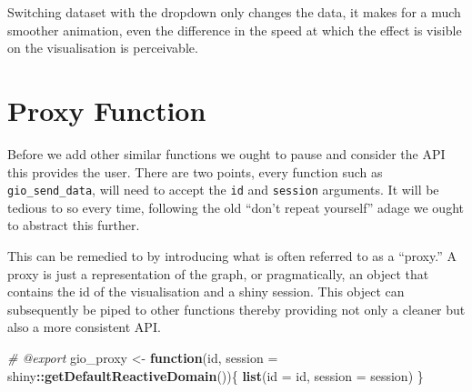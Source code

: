 \documentclass[
]{krantz}
\makeatletter
\newenvironment{Shaded}{\begin{snugshade}}{\end{snugshade}}
\newcommand{\CommentTok}[1]{\textcolor[rgb]{0.37,0.37,0.37}{\textit{#1}}}
\newcommand{\ControlFlowTok}[1]{\textcolor[rgb]{0.27,0.27,0.27}{\textbf{#1}}}
\newcommand{\DataTypeTok}[1]{\textcolor[rgb]{0.27,0.27,0.27}{#1}}
\newcommand{\KeywordTok}[1]{\textcolor[rgb]{0.27,0.27,0.27}{\textbf{#1}}}
\newcommand{\NormalTok}[1]{#1}
\newcommand{\OperatorTok}[1]{\textcolor[rgb]{0.43,0.43,0.43}{\textbf{#1}}}
\newcommand{\StringTok}[1]{\textcolor[rgb]{0.5,0.5,0.5}{#1}}
\newenvironment{kframe}{%
\medskip{}
\setlength{\fboxsep}{.8em}
 \def\at@end@of@kframe{}%
 \ifinner\ifhmode%
  \def\at@end@of@kframe{\end{minipage}}%
  \begin{minipage}{\columnwidth}%
 \fi\fi%
 \def\FrameCommand##1{\hskip\@totalleftmargin \hskip-\fboxsep
 \colorbox{shadecolor}{##1}\hskip-\fboxsep
     \hskip-\linewidth \hskip-\@totalleftmargin \hskip\columnwidth}%
 \MakeFramed {\advance\hsize-\width
   \@totalleftmargin\z@ \linewidth\hsize
   \@setminipage}}%
 {\par\unskip\endMakeFramed%
 \at@end@of@kframe}
\renewenvironment{Shaded}{\begin{kframe}}{\end{kframe}}
\makeatother
\begin{document}
\begin{Shaded}
\end{Shaded}

Switching dataset with the dropdown only changes the data, it makes for a much smoother animation, even the difference in the speed at which the effect is visible on the visualisation is perceivable.

\hypertarget{proxy-function}{%
\section*{Proxy Function}\label{proxy-function}}


Before we add other similar functions we ought to pause and consider the API this provides the user. There are two points, every function such as \texttt{gio\_send\_data}, will need to accept the \texttt{id} and \texttt{session} arguments. It will be tedious to so every time, following the old ``don't repeat yourself'' adage we ought to abstract this further.

This can be remedied to by introducing what is often referred to as a ``proxy.'' A proxy is just a representation of the graph, or pragmatically, an object that contains the id of the visualisation and a shiny session. This object can subsequently be piped to other functions thereby providing not only a cleaner but also a more consistent API.

\begin{Shaded}
\begin{Highlighting}[]
\CommentTok{\#\textquotesingle{} @export}
\NormalTok{gio\_proxy \textless{}{-}}\StringTok{ }\ControlFlowTok{function}\NormalTok{(id, }\DataTypeTok{session =}\NormalTok{ shiny}\OperatorTok{::}\KeywordTok{getDefaultReactiveDomain}\NormalTok{())\{}
  \KeywordTok{list}\NormalTok{(}\DataTypeTok{id =}\NormalTok{ id, }\DataTypeTok{session =}\NormalTok{ session)}
\NormalTok{\}}
\end{Highlighting}
\end{Shaded}
\end{document}
